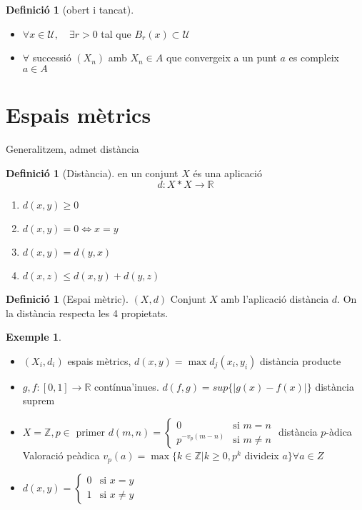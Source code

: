 \documentclass{article}
\theoremstyle{definition}
\newtheorem{definition}[theorem]{Definició}
\newtheorem{example}[theorem]{Exemple}
\newcommand{\R}{\mathbb{R}}
\newcommand{\Z}{\mathbb{Z}}
\newcommand{\U}{\mathcal{U}}
\begin{document}
\begin{definition}[obert i tancat]
\begin{itemize}
\item[obert] $\forall x \in \U, \quad \exists r > 0$ tal que $B_r(x) \subset \U$
\item[tancat] $\forall$ successió $(X_n)$ amb $X_n \in A$ que convergeix a un punt $a$ es compleix $a \in A$
\end{itemize}
\end{definition}

\section{Espais mètrics}
Generalitzem, admet distància
\begin{definition}[Distància]
en un conjunt $X$ és una aplicació
$$d:X*X\to\R$$
\begin{enumerate}[label=\bfseries D\arabic*)]
\item $d(x, y) \geq 0$
\item $d(x, y) = 0 \Leftrightarrow x = y$
\item $d(x, y) = d(y, x)$
\item $d(x, z) \leq d(x, y) + d(y, z)$
\end{enumerate}
\end{definition}

\begin{definition}[Espai mètric]
$(X, d)$ Conjunt $X$ amb l'aplicació distància $d$. On la distància respecta les 4 propietats.
\end{definition}

\begin{example}
\begin{itemize}
\item $(X_i, d_i)$ espais mètrics, $d(x, y) = \max{d_j(x_i, y_i)}$ distància producte
\item $g, f: [0, 1] \to \R$ contínua'inues. $d(f, g) = sup\{|g(x) - f(x)|\}$ distància suprem
\item $X = \Z, p \in$ primer $d(m, n) = \left\{\begin{array}{ll}0 &\text{si } m=n\\p^{-v_p(m-n)} &\text{si } m\neq n\end{array}\right.$ distància $p$-àdica
	\subitem Valoració peàdica $v_p(a) = \max\{k\in \Z| k \geq 0, p^k$ divideix $a \} \forall a \in Z$
\item $d(x,y) = \left\{\begin{array}{ll}0&\text{si }x=y\\1&\text{si }x\neq y\end{array}\right.$
\end{itemize}
\end{example}
\end{document}
